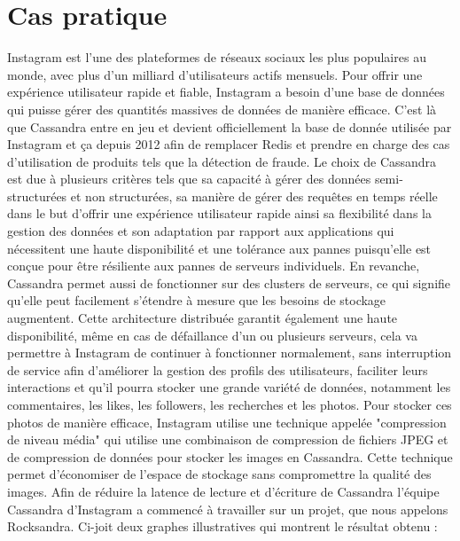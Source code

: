 \documentclass[12pt, letterpaper]{report}
\begin{document}
\section{Cas pratique}
Instagram est l'une des plateformes de réseaux sociaux les plus populaires au monde, avec plus d'un milliard d'utilisateurs actifs mensuels. Pour offrir une expérience utilisateur rapide et fiable, Instagram a besoin d'une base de données qui puisse gérer des quantités massives de données de manière efficace. C'est là que Cassandra entre en jeu et devient officiellement la base de donnée utilisée par Instagram et ça depuis 2012 afin de remplacer Redis et prendre en charge des cas d'utilisation de produits tels que la détection de fraude.
\newline
Le choix de Cassandra est due à plusieurs critères tels que sa capacité à gérer des données semi-structurées et non structurées, sa manière de gérer des requêtes en temps réelle dans le but d'offrir une expérience utilisateur rapide ainsi sa flexibilité dans la gestion des données et son adaptation par rapport aux applications qui nécessitent une haute disponibilité et une tolérance aux pannes puisqu’elle est conçue pour être résiliente aux pannes de serveurs individuels. 
\newline
En revanche, Cassandra permet aussi de fonctionner sur des clusters de serveurs, ce qui signifie qu'elle peut facilement s'étendre à mesure que les besoins de stockage augmentent. Cette architecture distribuée garantit également une haute disponibilité, même en cas de défaillance d'un ou plusieurs serveurs, cela va permettre à Instagram de continuer à fonctionner normalement, sans interruption de service afin d’améliorer la gestion des profils des utilisateurs, faciliter leurs interactions et qu’il pourra stocker une grande variété de données, notamment les commentaires, les likes, les followers, les recherches et les photos.
\newline
Pour stocker ces photos de manière efficace, Instagram utilise une technique appelée "compression de niveau média" qui utilise une combinaison de compression de fichiers JPEG et de compression de données pour stocker les images en Cassandra. Cette technique permet d'économiser de l'espace de stockage sans compromettre la qualité des images.
\newline
Afin de réduire la latence de lecture et d’écriture de Cassandra l'équipe Cassandra d'Instagram a commencé à travailler sur un projet, que nous appelons Rocksandra.
\newline
Ci-joit deux graphes illustratives qui montrent le résultat obtenu :
\end{document}

